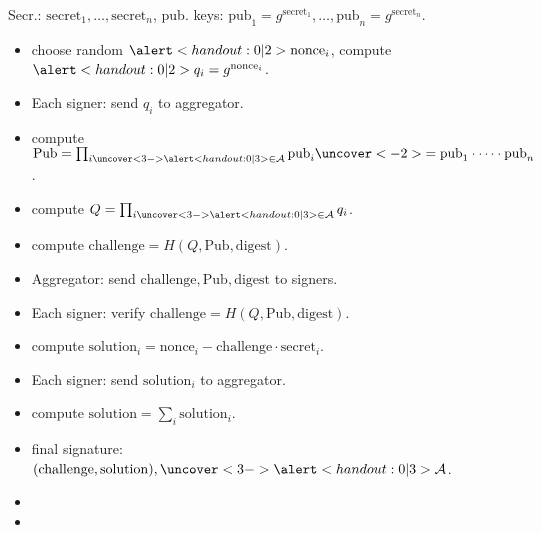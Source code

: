 \begin{frame}
Secr.: $\mathrm{secret}_1, \dots, \mathrm{secret}_n$, pub. keys: $\mathrm{pub}_1 = g^{ \mathrm{secret }_1 }, \dots, \mathrm{pub}_n= g^{\mathrm{secret}_n}$.

\begin{emptyTheorem}
\begin{itemize}
\item<2->  choose random $\alertNoH{2}{ \mathrm{nonce}_i}$, compute $ \alertNoH{2}{q_i = g^{\mathrm{nonce}_i}} $.
\item<10-> Each signer: send $q_i$ to aggregator.  
\item<3->  compute $ \mathrm{Pub} =\prod_{i \uncover<3->{ \alertNoH{3}{\in \mathcal A} }} \mathrm{pub}_i \uncover<-2>{=\mathrm{pub}_1\cdot \dots \cdot \mathrm{pub}_n}$. 
\item {} compute $ Q = \prod_{i \uncover<3->{ \alertNoH{3}{\in \mathcal A} }} q_i$.
\item {} compute  $\mathrm{challenge} = H(Q, \mathrm{Pub}, \mathrm{digest})$.
\item<2-> Aggregator: send $\mathrm{challenge},\mathrm{Pub}, \mathrm{digest}$ to signers. 
\item<2-> Each signer: verify $\mathrm{challenge} = H(Q, \mathrm {Pub}, \mathrm{digest}) $.
\item {} compute $\mathrm{solution}_i = {\mathrm{nonce}_i - \mathrm{challenge} \cdot \mathrm{secret}_i} $.
\item<2-> Each signer: send $\mathrm{solution}_i$ to aggregator. 
\item {} compute $\mathrm{solution} = \sum_i \mathrm{solution}_i $.
\item {} final signature: $(\mathrm{challenge}, \mathrm{solution}), \uncover<3->{\alertNoH{3}{\mathcal A}}$.
\end{itemize}
\end{emptyTheorem}
\vskip -0.15cm
\begin{itemize}
\item {}
\item {}
\end{itemize}
\vskip 15cm
\end{frame}

